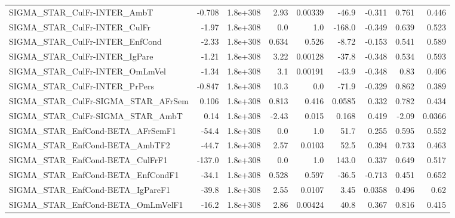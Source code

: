 \begin{tabular}{lrrrrrrrr}
SIGMA\_STAR\_CulFr-INTER\_AmbT           &      -0.708 &     1.8e+308 &    2.93 &  0.00339 &      -46.9 &      -0.311 &        0.761 &         0.446 \\
SIGMA\_STAR\_CulFr-INTER\_CulFr          &       -1.97 &     1.8e+308 &     0.0 &      1.0 &     -168.0 &      -0.349 &        0.639 &         0.523 \\
SIGMA\_STAR\_CulFr-INTER\_EnfCond        &       -2.33 &     1.8e+308 &   0.634 &    0.526 &      -8.72 &      -0.153 &        0.541 &         0.589 \\
SIGMA\_STAR\_CulFr-INTER\_IgPare         &       -1.21 &     1.8e+308 &    3.22 &  0.00128 &      -37.8 &      -0.348 &        0.534 &         0.593 \\
SIGMA\_STAR\_CulFr-INTER\_OmLmVel        &       -1.34 &     1.8e+308 &     3.1 &  0.00191 &      -43.9 &      -0.348 &         0.83 &         0.406 \\
SIGMA\_STAR\_CulFr-INTER\_PrPers         &      -0.847 &     1.8e+308 &    10.3 &      0.0 &      -71.9 &      -0.329 &        0.862 &         0.389 \\
SIGMA\_STAR\_CulFr-SIGMA\_STAR\_AFrSem    &       0.106 &     1.8e+308 &   0.813 &    0.416 &     0.0585 &       0.332 &        0.782 &         0.434 \\
SIGMA\_STAR\_CulFr-SIGMA\_STAR\_AmbT      &        0.14 &     1.8e+308 &   -2.43 &    0.015 &      0.168 &       0.419 &        -2.09 &        0.0366 \\
SIGMA\_STAR\_EnfCond-BETA\_AFrSemF1      &       -54.4 &     1.8e+308 &     0.0 &      1.0 &       51.7 &       0.255 &        0.595 &         0.552 \\
SIGMA\_STAR\_EnfCond-BETA\_AmbTF2        &       -44.7 &     1.8e+308 &    2.57 &   0.0103 &       52.5 &       0.394 &        0.733 &         0.463 \\
SIGMA\_STAR\_EnfCond-BETA\_CulFrF1       &      -137.0 &     1.8e+308 &     0.0 &      1.0 &      143.0 &       0.337 &        0.649 &         0.517 \\
SIGMA\_STAR\_EnfCond-BETA\_EnfCondF1     &       -34.1 &     1.8e+308 &   0.528 &    0.597 &      -36.5 &      -0.713 &        0.451 &         0.652 \\
SIGMA\_STAR\_EnfCond-BETA\_IgPareF1      &       -39.8 &     1.8e+308 &    2.55 &   0.0107 &       3.45 &      0.0358 &        0.496 &          0.62 \\
SIGMA\_STAR\_EnfCond-BETA\_OmLmVelF1     &       -16.2 &     1.8e+308 &    2.86 &  0.00424 &       40.8 &       0.367 &        0.816 &         0.415 \\

\end{tabular}
